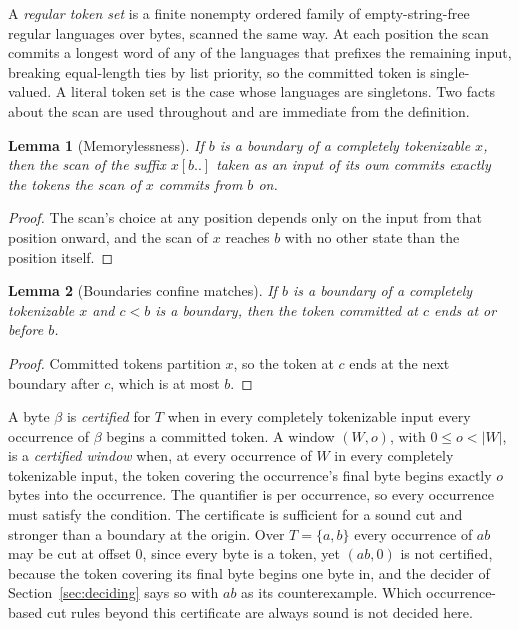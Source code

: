 \documentclass[11pt,a4paper]{article}
\theoremstyle{definition}
\theoremstyle{plain}
\newtheorem{lemma}{Lemma}
\begin{document}
A \emph{regular token set} is a finite nonempty ordered family of empty-string-free regular languages over bytes,
scanned the same way. At each position the scan commits a longest word of any of the languages that prefixes the
remaining input, breaking equal-length ties by list priority, so the committed token is single-valued. A literal token
set is the case whose languages are singletons. Two facts about the scan are used throughout and are immediate from the
definition.

\begin{lemma}[Memorylessness]\label{lem:memoryless}
If $b$ is a boundary of a completely tokenizable $x$, then the scan of the suffix $x[b..]$ taken as an input of its own
commits exactly the tokens the scan of $x$ commits from $b$ on.
\end{lemma}

\begin{proof}
The scan's choice at any position depends only on the input from that position onward, and the scan of $x$ reaches $b$
with no other state than the position itself.
\end{proof}

\begin{lemma}[Boundaries confine matches]\label{lem:confine}
If $b$ is a boundary of a completely tokenizable $x$ and $c < b$ is a boundary, then the token committed at $c$ ends at
or before $b$.
\end{lemma}

\begin{proof}
Committed tokens partition $x$, so the token at $c$ ends at the next boundary after $c$, which is at most $b$.
\end{proof}

A byte $\beta$ is \emph{certified} for $T$ when in every completely tokenizable input every occurrence of $\beta$ begins
a committed token. A window $(W, o)$, with $0 \le o < |W|$, is a \emph{certified window} when, at every occurrence of
$W$ in every completely tokenizable input, the token covering the occurrence's final byte begins exactly $o$ bytes into
the occurrence. The quantifier is per occurrence, so every occurrence must satisfy the condition. The certificate is
sufficient for a sound cut and stronger than a boundary at the origin. Over $T = \{a, b\}$ every occurrence of $ab$ may
be cut at offset $0$, since every byte is a token, yet $(ab, 0)$ is not certified, because the token covering its final
byte begins one byte in, and the decider of Section~\ref{sec:deciding} says so with $ab$ as its counterexample. Which
occurrence-based cut rules beyond this certificate are always sound is not decided here.
\end{document}
